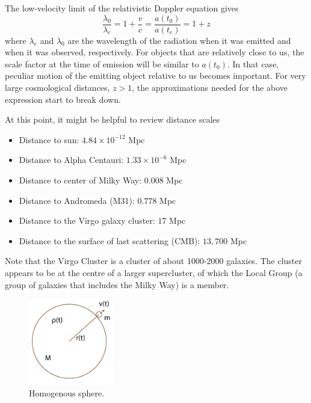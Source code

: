\documentclass[a4paper,12pt]{article}
\theoremstyle{remark}
\renewcommand{\=}[1]{\stackrel{#1}{=}} %
\theoremstyle{plain}
\theoremstyle{definition}
\begin{document}
The low-velocity limit of the relativistic Doppler equation gives 
\begin{equation}
\frac{\lambda_0}{\lambda_e} = 1+\frac{v}{c} = \frac{a(t_0)}{a(t_e)} = 1+z
\end{equation}
where $\lambda _e$ and $\lambda _0$ are the wavelength of the radiation when it was emitted and when it was observed, respectively. For objects that are relatively close to us, the scale factor at the time of emission will be similar to $a(t_0)$. In that case, peculiar motion of the emitting object relative to us becomes important. For very large cosmological distances, $z > 1$, the approximations needed for the above expression start to break down. 

At this point, it might be helpful to review distance scales
\vspace{-5mm}
\begin{itemize}
\itemsep-0.2em
\item Distance to sun: $4.84 \times 10^{-12}$ Mpc
\item Distance to Alpha Centauri: $1.33 \times 10^{-6}$ Mpc
\item Distance to center of Milky Way: $0.008$ Mpc
\item Distance to Andromeda (M31): $0.778$ Mpc
\item Distance to the Virgo galaxy cluster: $17$ Mpc
\item Distance to the surface of last scattering (CMB): $13,700$ Mpc
\end{itemize}
\vspace{-5mm}
Note that the Virgo Cluster is a cluster of about 1000-2000 galaxies. The cluster appears to be at the centre of a larger supercluster, of which the Local Group (a group of galaxies that includes the Milky Way) is a member.

\vspace{-10mm}
\begin{figure}
\begin{center}
    \vspace{-10mm}
    \includegraphics*[angle=0,width=0.33\textwidth]{img/gauss_law.png}
    \caption[Insert text]{Homogenous sphere.}%
\label{fig:sphere}
\end{center}
\end{figure}
\end{document}
